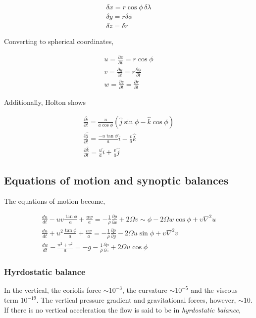 \documentclass[a4paper,12pt]{article}
\begin{document}
\begin{align}
\delta x = r\cos\phi \, \delta \lambda \\
\delta y = r \delta \phi\\
\delta z = \delta r
\end{align}

Converting to spherical coordinates,

\begin{align}
u = \frac{\partial x}{\partial t} = r\cos\phi\\
v = \frac{\partial y}{\partial t} = r\frac{\partial \phi}{\partial t}\\
w = \frac{\partial z}{\partial t} = \frac{\partial r}{\partial t}
\end{align}

Additionally, Holton shows

\begin{align}
\frac{\partial \hat{i}}{\partial t} = \frac{u}{a\cos\phi}(\hat{j}\sin\phi - \hat{k}\cos\phi)\\
\frac{\partial \hat{j}}{\partial t} = \frac{-u\tan\phi}{a} \hat{i} - \frac{v}{a} \hat{k}\\
\frac{\partial \hat{k}}{\partial t} = \frac{u}{a} \hat{i} + \frac{v}{a} \hat{j}
\end{align}

\subsection*{Equations of motion and synoptic balances}
The equations of motion become,

\begin{align}
\frac{du}{dt} - uv\frac{\tan\phi}{a} + \frac{uw}{a} = -\frac{1}{\rho} \frac{\partial p}{\partial x} + 2\Omega v\sim\phi - 2\Omega w\cos\phi + \upsilon\nabla^2 u\\
\frac{du}{dt} + u^2\frac{\tan\phi}{a} + \frac{vw}{a} = -\frac{1}{\rho} \frac{\partial p}{\partial y} - 2\Omega u \sin\phi + \upsilon\nabla^2 v\\
\frac{dw}{dt} - \frac{u^2 + v^2}{a} = -g - \frac{1}{\rho}\frac{\partial p}{\partial z} + 2\Omega u \cos\phi
\end{align}

\subsubsection*{Hyrdostatic balance}
In the vertical, the coriolis force $\sim 10^{-3}$, the curvature $\sim 10^{-5}$ and the viscous term $10^{-19}$. The vertical pressure gradient and gravitational forces, however, $\sim 10$. If there is no vertical acceleration the flow is said to be in \emph{hyrdostatic balance},
\end{document}
